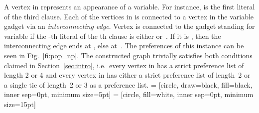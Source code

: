 \documentclass[11pt]{llncs}
\begin{document}
A vertex in  represents an appearance of a variable. For instance,  is the first literal of the third clause. Each of 
the vertices in  is connected to a vertex in the variable gadget via an \emph{interconnecting edge}. Vertex  is 
connected to the gadget standing for variable  if the -th literal of the th clause is either  or~. If it is ,
then the interconnecting edge ends at , else at~. The preferences of this instance can be seen in 
Fig.~\ref{fi:pop_np}. The constructed graph trivially satisfies both conditions claimed in Section~\ref{sec:intro}, i.e.\ 
every vertex in  has a strict preference list of length 2 or 4 and every vertex in  has either a strict preference list of length~2 
or a single tie of length~2 or 3 as a preference list.
 = [circle, draw=black, fill=black, inner sep=0pt,  minimum size=5pt]
\tikzstyle{edgelabel} = [circle, fill=white, inner sep=0pt,  minimum size=15pt]
\end{document}
